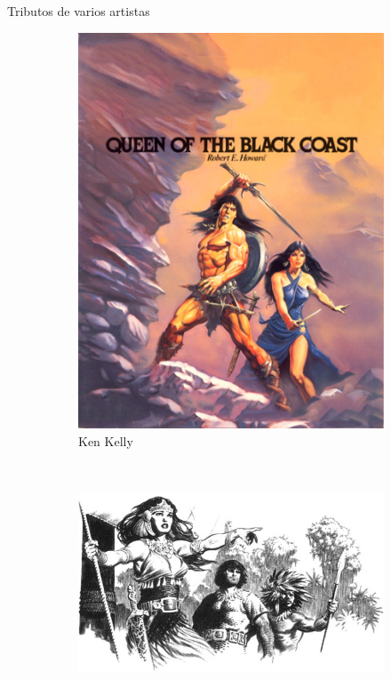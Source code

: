 \begin{frame}{Tributos de varios artistas}
	\begin{figure}[htp]
		\centering
		\begin{subfigure}[b]{0.22\textwidth}
			\includegraphics[width=\textwidth]{img/tributos/KenKelly}
			\caption{Ken Kelly}
		\end{subfigure}
		~
		\begin{subfigure}[b]{0.4\textwidth}
			\includegraphics[width=\textwidth]{img/tributos/MarkSchultz}

\end{subfigure}
\end{figure}
\end{frame}
